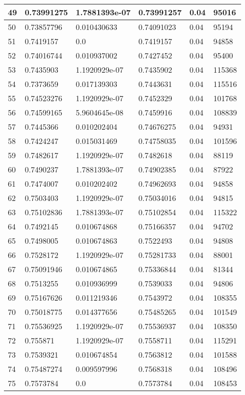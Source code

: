 \begin{longtable}{|l|l|l|l|l|l|}
49 & 0.73991275 & 1.7881393e-07 & 0.73991257 & 0.04 & 95016 \\ \hline 
50 & 0.73857796 & 0.010430633 & 0.74091023 & 0.04 & 95194 \\ \hline 
51 & 0.7419157 & 0.0 & 0.7419157 & 0.04 & 94858 \\ \hline 
52 & 0.74016744 & 0.010937002 & 0.7427452 & 0.04 & 95400 \\ \hline 
53 & 0.7435903 & 1.1920929e-07 & 0.7435902 & 0.04 & 115368 \\ \hline 
54 & 0.7373659 & 0.017139303 & 0.7443631 & 0.04 & 115516 \\ \hline 
55 & 0.74523276 & 1.1920929e-07 & 0.7452329 & 0.04 & 101768 \\ \hline 
56 & 0.74599165 & 5.9604645e-08 & 0.7459916 & 0.04 & 108839 \\ \hline 
57 & 0.7445366 & 0.010202404 & 0.74676275 & 0.04 & 94931 \\ \hline 
58 & 0.7424247 & 0.015031469 & 0.74758035 & 0.04 & 101596 \\ \hline 
59 & 0.7482617 & 1.1920929e-07 & 0.7482618 & 0.04 & 88119 \\ \hline 
60 & 0.7490237 & 1.7881393e-07 & 0.74902385 & 0.04 & 87922 \\ \hline 
61 & 0.7474007 & 0.010202402 & 0.74962693 & 0.04 & 94858 \\ \hline 
62 & 0.7503403 & 1.1920929e-07 & 0.75034016 & 0.04 & 94815 \\ \hline 
63 & 0.75102836 & 1.7881393e-07 & 0.75102854 & 0.04 & 115322 \\ \hline 
64 & 0.7492145 & 0.010674868 & 0.75166357 & 0.04 & 94702 \\ \hline 
65 & 0.7498005 & 0.010674863 & 0.7522493 & 0.04 & 94808 \\ \hline 
66 & 0.7528172 & 1.1920929e-07 & 0.75281733 & 0.04 & 88001 \\ \hline 
67 & 0.75091946 & 0.010674865 & 0.75336844 & 0.04 & 81344 \\ \hline 
68 & 0.7513255 & 0.010936999 & 0.7539033 & 0.04 & 94806 \\ \hline 
69 & 0.75167626 & 0.011219346 & 0.7543972 & 0.04 & 108355 \\ \hline 
70 & 0.75018775 & 0.014377656 & 0.75485265 & 0.04 & 101549 \\ \hline 
71 & 0.75536925 & 1.1920929e-07 & 0.75536937 & 0.04 & 108350 \\ \hline 
72 & 0.755871 & 1.1920929e-07 & 0.7558711 & 0.04 & 115291 \\ \hline 
73 & 0.7539321 & 0.010674854 & 0.7563812 & 0.04 & 101588 \\ \hline 
74 & 0.75487274 & 0.009597996 & 0.7568318 & 0.04 & 108496 \\ \hline 
75 & 0.7573784 & 0.0 & 0.7573784 & 0.04 & 108453 \\ \hline 
\end{longtable}